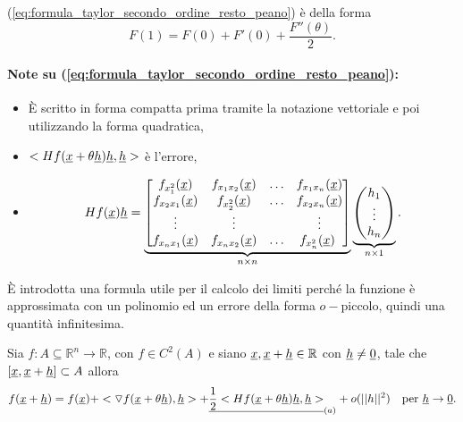 (\ref{eq:formula_taylor_secondo_ordine_resto_peano}) è della forma
\begin{equation*}
	F(1) = F(0) + F'(0) + \frac{F''(\theta)}{2}.
\end{equation*}

\paragraph{Note su (\ref{eq:formula_taylor_secondo_ordine_resto_peano}):}
\begin{itemize}
	\item È scritto in forma compatta prima tramite la notazione vettoriale e poi utilizzando la forma quadratica,
	\item $<Hf(\uline x + \theta \uline h)\uline h, \uline h>$ è l'errore,
	\item
	\begin{equation*}
		Hf(\uline x) \uline h = 
		\underbrace{\begin{bmatrix}
			f_{x_1^2}(\uline x) & f_{x_1x_2}(\uline x) & \hdots & f_{x_1x_n}(\uline x)\\
			f_{x_2x_1}(\uline x) & f_{x_2^2}(\uline x) & \hdots & f_{x_2x_n}(\uline x)\\
			\vdots & \vdots & & \vdots\\
			f_{x_nx_1}(\uline x) & f_{x_nx_2}(\uline x) & \hdots & f_{x_n^2}(\uline x)\
		\end{bmatrix}}_{n\times n}
		\underbrace{\begin{pmatrix}
				h_1\\
				\vdots\\
				h_n
		\end{pmatrix}}_{n\times 1}.
	\end{equation*}
\end{itemize}

È introdotta una formula utile per il calcolo dei limiti perché la funzione è approssimata con un polinomio ed un errore della forma $o-$piccolo, quindi una quantità infinitesima.

\begin{definition}[Formula di Taylor al secondo ordine ($k=2$) con resto di Peano (come $o-$piccolo)]
	Sia $f:A\subseteq\mathbb{R}^n\rightarrow\mathbb{R}$, con $f\in C^2(A)$ e siano $\uline x, \uline x+\uline h\in\mathbb{R}$ con $\uline h\neq\uline 0$, tale che $[\uline x, \uline x+\uline h] \subset A$ allora
	\begin{equation}\label{eq:formula_taylor_secondo_ordine_resto_peano_o_piccolo}
		f(\uline x+\uline h) = f(\uline x) + <\triangledown f(\uline x + \theta \uline h), \uline h> + \uline{\frac{1}{2} <Hf(\uline x + \theta \uline h)\uline h, \uline h>}_{(a)} + o(||h||^2)\quad \text{per }\uline h\rightarrow\uline 0.
	\end{equation}
\end{definition}

